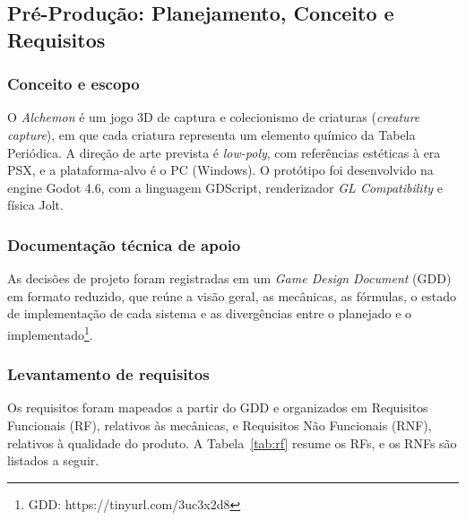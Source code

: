 \subsection{Pré-Produção: Planejamento, Conceito e Requisitos}

\subsubsection{Conceito e escopo}
O \textit{Alchemon} é um jogo 3D de captura e colecionismo de criaturas (\textit{creature capture}), em que cada criatura representa um elemento químico da Tabela Periódica. A direção de arte prevista é \textit{low-poly}, com referências estéticas à era PSX, e a plataforma-alvo é o PC (Windows). O protótipo foi desenvolvido na engine Godot 4.6, com a linguagem GDScript, renderizador \textit{GL Compatibility} e física Jolt.

\subsubsection{Documentação técnica de apoio}
As decisões de projeto foram registradas em um \textit{Game Design Document} (GDD) em formato reduzido, que reúne a visão geral, as mecânicas, as fórmulas, o estado de implementação de cada sistema e as divergências entre o planejado e o implementado\footnote{GDD: https://tinyurl.com/3uc3x2d8}.

\subsubsection{Levantamento de requisitos}
Os requisitos foram mapeados a partir do GDD e organizados em Requisitos Funcionais (RF), relativos às mecânicas, e Requisitos Não Funcionais (RNF), relativos à qualidade do produto. A Tabela~\ref{tab:rf} resume os RFs, e os RNFs são listados a seguir.

